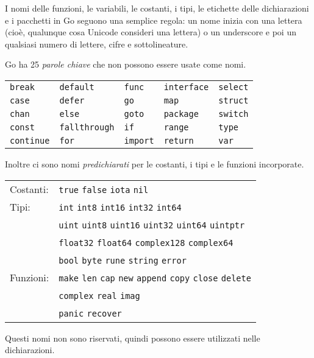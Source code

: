 %
I nomi delle funzioni, le variabili, le costanti, i tipi, le etichette delle dichiarazioni e i pacchetti in Go seguono una semplice regola: un nome inizia con una lettera (cioè, qualunque cosa Unicode consideri una lettera) o un underscore e poi un qualsiasi numero di lettere, cifre e sottolineature.

Go ha 25 \textit{parole chiave} che non possono essere usate come nomi.
\begin{table}[H]
    \centering
    \begin{tabular}{ l l l l l }
        \verb|break|    & \verb|default|     & \verb|func|   & \verb|interface| & \verb|select| \\
        \verb|case|     & \verb|defer|       & \verb|go|     & \verb|map|       & \verb|struct| \\
        \verb|chan|     & \verb|else|        & \verb|goto|   & \verb|package|   & \verb|switch| \\
        \verb|const|    & \verb|fallthrough| & \verb|if|     & \verb|range|     & \verb|type|   \\
        \verb|continue| & \verb|for|         & \verb|import| & \verb|return|    & \verb|var|
    \end{tabular}
    \label{tab:table11}
\end{table}

Inoltre ci sono nomi \textit{predichiarati} per le costanti, i tipi e le funzioni incorporate.
\begin{table}[H]
    \centering
    \begin{tabular}{ l l }
        Costanti: & \verb|true| \verb|false| \verb|iota| \verb|nil|                                                   \\
        Tipi:     & \verb|int| \verb|int8| \verb|int16| \verb|int32| \verb|int64|                                     \\
        & \verb|uint| \verb|uint8| \verb|uint16| \verb|uint32| \verb|uint64| \verb|uintptr|                 \\
        & \verb|float32| \verb|float64| \verb|complex128| \verb|complex64|                                  \\
        & \verb|bool| \verb|byte| \verb|rune| \verb|string| \verb|error|                                    \\
        Funzioni: & \verb|make| \verb|len| \verb|cap| \verb|new| \verb|append| \verb|copy| \verb|close| \verb|delete| \\
        & \verb|complex| \verb|real| \verb|imag|                                                            \\
        & \verb|panic| \verb|recover|
    \end{tabular}
    \label{tab:table12}
\end{table}
Questi nomi non sono riservati, quindi possono essere utilizzati nelle dichiarazioni.

